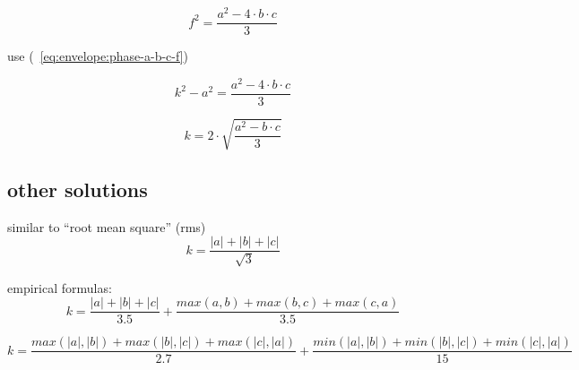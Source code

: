 \documentclass[unicode, 12pt, a4paper]{article}
\begin{document}
\begin{equation}
  f^2 = \frac{a^2 - 4 \cdot b \cdot c}{3}
\end{equation}

use (~\ref{eq:envelope:phase-a-b-c-f})

\begin{equation}
  k^2 - a^2 = \frac{a^2 - 4 \cdot b \cdot c}{3}
\end{equation}

\begin{equation}
  k = 2 \cdot \sqrt{\frac{a^2 - b \cdot c}{3}}
\end{equation}


\subsection{other solutions}

similar to ``root mean square'' (rms)
\begin{equation}
  k = \frac{|a| + |b| + |c|}{\sqrt{3}}
\end{equation}

empirical formulas:
\begin{equation}
  k = \frac{|a| + |b| + |c|}{3.5} + \frac{max(a, b) + max(b, c) + max(c, a)}{3.5}
\end{equation}

\begin{equation}
  k = \frac{max(|a|, |b|) + max(|b|, |c|) + max(|c|, |a|)}{2.7} + \frac{  min(|a|, |b|) + min(|b|, |c|) + min(|c|, |a|)}{15}
\end{equation}
\end{document}
